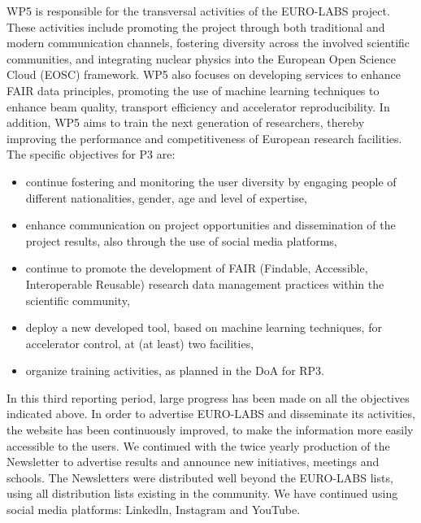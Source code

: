 \begin{prtwo}
\end{prtwo}


 WP5 
 is responsible for the transversal activities of the EURO-LABS project. These activities include promoting the project through both traditional and modern communication channels, fostering diversity across the involved scientific communities, and integrating nuclear physics into the European Open Science Cloud (EOSC) framework. WP5 also focuses on developing services to enhance FAIR data principles, promoting the use of machine learning techniques to enhance beam quality, transport efficiency and accelerator reproducibility. In addition, WP5 aims to train the next generation of researchers, thereby improving the performance and competitiveness of European research facilities.
 The specific objectives for P3 are: 
\begin{itemize}
    \item continue fostering and monitoring the user diversity by engaging people of different nationalities, gender, age and level of expertise,
    \item enhance communication on project opportunities and dissemination of the project results, also through the use of social media platforms,
    \item continue to promote the development of FAIR (Findable, Accessible, Interoperable Reusable) research data management practices within the scientific community,
    \item deploy a  new developed tool, based on machine learning techniques, for accelerator control, at (at least) two facilities,
    \item organize training activities, as planned in the DoA for RP3.
\end{itemize}
In this third reporting period, large progress has been made on all the objectives indicated above. In order to advertise EURO-LABS and disseminate its activities, the website has been continuously improved, to make the information more easily accessible to the users.  
We continued with the twice yearly production of the Newsletter to advertise results and announce new initiatives, meetings and schools. The Newsletters were distributed well beyond the EURO-LABS lists, using all distribution lists existing in the community. We have continued using social media platforms: Linkedln, Instagram and YouTube.

